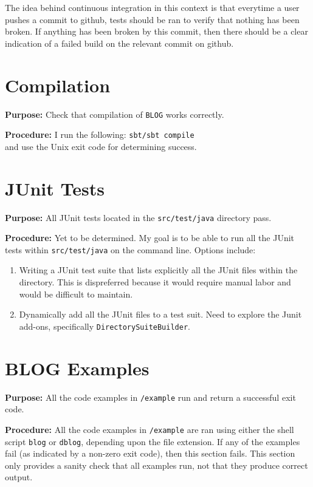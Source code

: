 \documentclass[11pt]{article}
\begin{document}
\maketitle

The idea behind continuous integration in this context is that everytime a user pushes a commit to github, tests should be ran to verify that nothing has been broken. If anything has been broken by this commit, then there should be a clear indication of a failed build on the relevant commit on github.

\section{Compilation}
\textbf{Purpose:} Check that compilation of \texttt{BLOG} works correctly.

\textbf{Procedure:} I run the following: \texttt{sbt/sbt compile} \\
and use the Unix exit code for determining success.

\section{JUnit Tests}
\textbf{Purpose:} All JUnit tests located in the \texttt{src/test/java} directory pass.

\textbf{Procedure:} Yet to be determined. My goal is to be able to run all the JUnit tests within \texttt{src/test/java} on the command line. Options include:
\begin{enumerate}
	\item Writing a JUnit test suite that lists explicitly all the JUnit files within the directory. This is dispreferred because it would require manual labor and would be difficult to maintain.
	\item Dynamically add all the JUnit files to a test suit. Need to explore the Junit add-ons, specifically \texttt{DirectorySuiteBuilder}.
\end{enumerate} 

\section{BLOG Examples}

\textbf{Purpose:} All the code examples in \texttt{/example} run and return a successful exit code.

\textbf{Procedure:} All the code examples in \texttt{/example} are ran using either the shell script \texttt{blog} or \texttt{dblog}, depending upon the file extension. If  any of the examples fail (as indicated by a non-zero exit code), then this section fails. This section only provides a sanity check that all examples run, not that they produce correct output.
\end{document}

